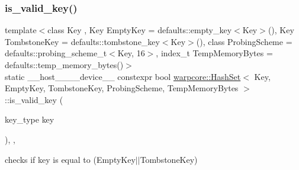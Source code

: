 \subsubsection{\texorpdfstring{is\+\_\+valid\+\_\+key()}{is\_valid\_key()}}
{\footnotesize\ttfamily template$<$class Key , Key Empty\+Key = defaults\+::empty\+\_\+key$<$\+Key$>$(), Key Tombstone\+Key = defaults\+::tombstone\+\_\+key$<$\+Key$>$(), class Probing\+Scheme  = defaults\+::probing\+\_\+scheme\+\_\+t$<$\+Key, 16$>$, index\+\_\+t Temp\+Memory\+Bytes = defaults\+::temp\+\_\+memory\+\_\+bytes()$>$ \\
static \+\_\+\+\_\+host\+\_\+\+\_\+\+\_\+\+\_\+device\+\_\+\+\_\+ constexpr bool \hyperlink{classwarpcore_1_1HashSet}{warpcore\+::\+Hash\+Set}$<$ Key, Empty\+Key, Tombstone\+Key, Probing\+Scheme, Temp\+Memory\+Bytes $>$\+::is\+\_\+valid\+\_\+key (\begin{DoxyParamCaption}\item[{key\+\_\+type}]{key }\end{DoxyParamCaption})\hspace{0.3cm}{\ttfamily [inline]}, {\ttfamily [static]}, {\ttfamily [noexcept]}}



checks if {\ttfamily key} is equal to {\ttfamily }(Empty\+Key$\vert$$\vert$\+Tombstone\+Key) 

